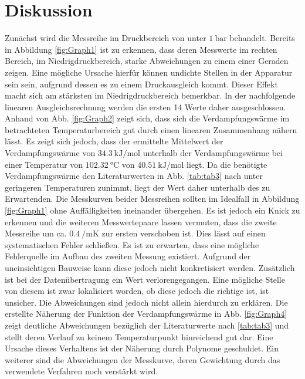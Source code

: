 
\section{Diskussion}
\label{sec:Diskussion}
Zunächst wird die Messreihe im Druckbereich von unter $\SI{1}{\bar}$
 behandelt. Bereits in Abbildung \ref{fig:Graph1} ist zu erkennen, dass deren Messwerte im
  rechten Bereich, im Niedrigdruckbereich, starke Abweichungen zu einem einer Geraden zeigen. Eine mögliche Ursache hierfür können
  undichte Stellen in der Apparatur sein sein, aufgrund dessen es zu einem
   Druckausgleich kommt. Dieser Effekt macht sich am stärksten im
   Niedrigdruckbereich bemerkbar. In der nachfolgende linearen Ausgleichsrechnung
    werden die ersten 14 Werte daher ausgeschlossen. Anhand von Abb.
     \ref{fig:Graph2} zeigt sich, dass sich die Verdampfungswärme im betrachteten
      Temperaturbereich gut durch einen linearen Zusammenhang nähern lässt. Es zeigt sich jedoch, dass der
      ermittelte Mittelwert der Verdampfungswärme von $\SI{34.3}{\kilo\joule\per\mol}$ unterhalb der Verdampfungswärme bei einer
       Temperatur von $\SI{102.32}{\degreeCelsius}$ von $\SI{40.51}{\kilo\joule\per\mol}$ \cite{WasserTab} liegt. Da die benötigte
       Verdampfungswärme den Literaturwerten in Abb. \ref{tab:tab3} nach  unter geringeren Temperaturen zunimmt, liegt der Wert
        daher unterhalb des zu Erwartenden. Die Messkurven beider
          Messreihen sollten im Idealfall in Abbildung \ref{fig:Graph1} ohne Auffälligkeiten ineinander übergehen.
           Es ist jedoch ein Knick zu erkennen und die weiteren Messwertepaare lassen vermuten, dass die zweite Messreihe um ca.
           $\SI{0.4}{\per\milli\kelvin}$ zur ersten verschoben ist. Dies lässt auf einen systematischen Fehler schließen. Es ist zu erwarten, dass eine mögliche
              Fehlerquelle im Aufbau des zweiten Messung existiert. Aufgrund der
               uneinsichtigen Bauweise kann diese jedoch nicht konkretisiert werden.
               Zusätzlich ist bei der Datenübertragung ein Wert verlorengegangen.
               Eine mögliche Stelle  von diesem ist zwar lokalisiert worden, ob diese jedoch die richtige ist, ist unsicher.
                Die Abweichungen sind jedoch nicht allein hierdurch zu erklären.
                 Die erstellte Näherung der Funktion der Verdampfungswärme in Abb. \ref{fig:Graph4} zeigt
                  deutliche Abweichungen bezüglich der Literaturwerte nach \ref{tab:tab3} und stellt deren
                   Verlauf zu keinem Temperaturpunkt hinreichend gut dar. Eine
                   Ursache dieses Verhaltens ist der Näherung durch Polynome geschuldet.
                    Ein weiterer sind die Abweichungen der Messkurve, deren
                     Gewichtung durch das verwendete Verfahren noch verstärkt wird. 
